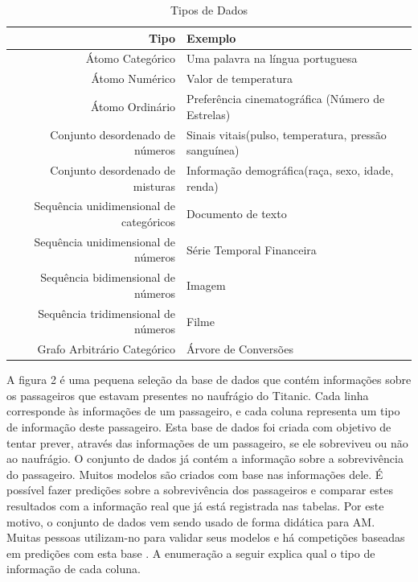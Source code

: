 \begin{table}[h]
\centering
\caption{Tipos de Dados}
\vspace{0.5cm}
\begin{tabular}{r|lr}

\hline 
Tipo & Exemplo  \\ %
\hline                               %
Átomo Categórico        & Uma palavra na língua portuguesa \\
\hline   
Átomo Numérico & Valor de temperatura \\
\hline 
Átomo Ordinário           & Preferência cinematográfica (Número de Estrelas) \\
\hline 
Conjunto desordenado de números       & Sinais vitais(pulso, temperatura, pressão sanguínea)\\
\hline 
Conjunto desordenado de misturas     & Informação demográfica(raça, sexo, idade, renda)\\
\hline 
Sequência unidimensional de categóricos       & Documento de texto\\
\hline 
Sequência unidimensional de números       & Série Temporal Financeira\\
\hline 
Sequência bidimensional de números      & Imagem\\
\hline 
Sequência tridimensional de números       & Filme\\
\hline 
Grafo Arbitrário Categórico       & Árvore de Conversões\\
 \hline 
\end{tabular}
\end{table}

A figura 2 é uma pequena seleção da base de dados que contém informações sobre os passageiros que estavam presentes no naufrágio do Titanic. Cada linha corresponde às informações de um passageiro, e cada coluna representa um tipo de informação deste passageiro. Esta base de dados foi criada com objetivo de tentar prever, através das informações de um passageiro, se ele sobreviveu ou não ao naufrágio. O conjunto de dados já contém a informação sobre a sobrevivência do passageiro. Muitos modelos são criados com base nas informações dele. É possível fazer predições sobre a sobrevivência dos passageiros e comparar estes resultados com a informação real que já está registrada nas tabelas. Por este motivo, o conjunto de dados vem sendo usado de forma didática para AM. Muitas pessoas utilizam-no para validar seus modelos e há competições baseadas em predições com esta base \cite{titanic2011}. A enumeração a seguir explica qual o tipo de informação de cada coluna.

